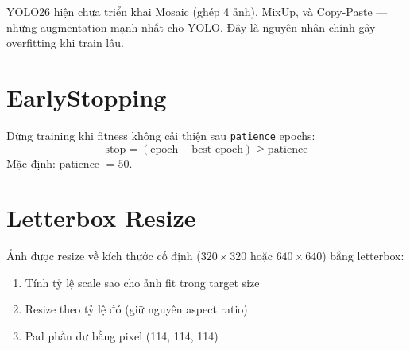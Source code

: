\begin{notebox}
YOLO26 hiện chưa triển khai Mosaic (ghép 4 ảnh), MixUp, và Copy-Paste --- những augmentation mạnh nhất cho YOLO. Đây là nguyên nhân chính gây overfitting khi train lâu.
\end{notebox}

\section{EarlyStopping}

Dừng training khi fitness không cải thiện sau \texttt{patience} epochs:
\begin{equation}
    \text{stop} = (\text{epoch} - \text{best\_epoch}) \geq \text{patience}
\end{equation}
Mặc định: patience $= 50$.

\section{Letterbox Resize}

Ảnh được resize về kích thước cố định ($320\times320$ hoặc $640\times640$) bằng letterbox:
\begin{enumerate}
    \item Tính tỷ lệ scale sao cho ảnh fit trong target size
    \item Resize theo tỷ lệ đó (giữ nguyên aspect ratio)
    \item Pad phần dư bằng pixel (114, 114, 114)
\end{enumerate}
